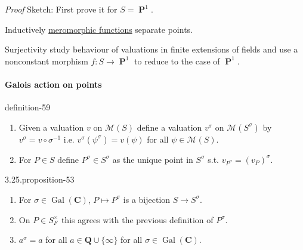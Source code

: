 \documentclass[10pt,]{book}
\makeatletter
\renewcommand*{\proofname}{Proof}
\renewenvironment{proof}[1][\proofname]{\par
  \pushQED{\qed}%
  \normalfont \topsep6\p@\@plus6\p@\relax
  \trivlist
  \item\relax
    {\itshape
    #1\@addpunct{.}}\hspace\labelsep\ignorespaces
}{%
  \popQED\endtrivlist\@endpefalse
}
\numberwithin{equation}{section}
\newcommand{\QQ}{\mathbf{Q}}
\newcommand{\CC}{\mathbf{C}}
\DeclareMathOperator{\PP}{\mathbf{P}}
\makeatother
\begin{document}
\begin{proof}\hypertarget{proof-93}{}
\hypertarget{p-621}{}%
Sketch: First prove it for \(S = \PP^1\).%
\par
\hypertarget{p-622}{}%
Inductively \hyperref[def-morph-riem-surf]{meromorphic functions} separate points.%
\par
\hypertarget{p-623}{}%
Surjectivity study behaviour of valuations in finite extensions of fields and use a nonconstant morphism \(f\colon S \to \PP^1\) to reduce to the case of \(\PP^1\).%
\end{proof}
%
%
\typeout{************************************************}
\typeout{************************************************}
%
\paragraph[{Galois action on points}]{Galois action on points}\hypertarget{paragraphs-14}{}
\begin{definition}{}{definition-59}%
\hypertarget{p-624}{}%
\leavevmode%
\begin{enumerate}
\item\hypertarget{li-125}{}Given a valuation \(v\) on \(\mathcal M(S)\) define a valuation \(v^\sigma\) on \(\mathcal M(S^\sigma)\) by \(v^\sigma = v\circ \sigma^{-1}\) i.e. \(v^\sigma(\psi^\sigma) = v(\psi)\) for all \(\psi \in \mathcal M(S)\).%
\item\hypertarget{li-126}{}For \(P \in S\) define \(P^\sigma \in S^\sigma\) as the unique point in \(S^\sigma\) s.t. \(v_{P^\sigma} = (v_P)^\sigma\).%
\end{enumerate}
%
\end{definition}
\begin{proposition}{3.25.}{}{proposition-53}%
\hypertarget{p-625}{}%
\leavevmode%
\begin{enumerate}
\item\hypertarget{li-127}{}For \(\sigma\in \operatorname{Gal}(\CC)\), \(P\mapsto P^\sigma\) is a bijection \(S\to S^\sigma\).%
\item\hypertarget{li-128}{}On \(P \in S_F^\times\) this agrees with the previous definition of \(P^\sigma\).%
\item\hypertarget{li-129}{}\(a^\sigma = a\) for all \(a\in \QQ \cup \{\infty\}\) for all \(\sigma \in \operatorname{Gal}(\CC)\).%
\end{enumerate}
%
\end{proposition}
\end{document}
